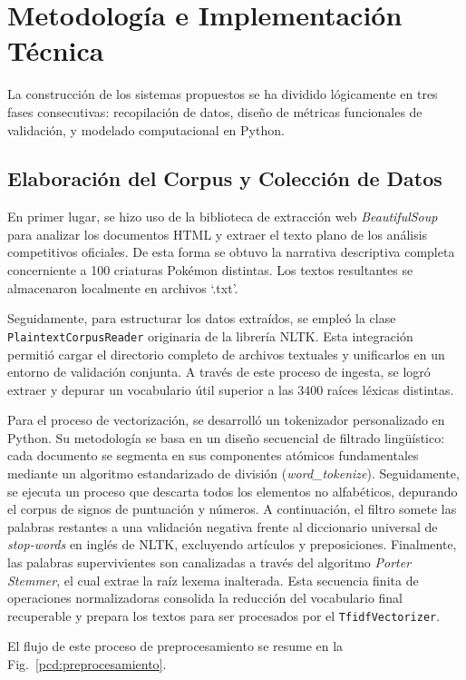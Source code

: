\documentclass[conference,a4paper]{IEEEtran}
\def\figurename{Fig.}
\begin{document}
\section{Metodología e Implementación Técnica}

La construcción de los sistemas propuestos se ha dividido lógicamente en tres fases consecutivas: recopilación de datos, diseño de métricas funcionales de validación, y modelado computacional en Python.

\subsection{Elaboración del Corpus y Colección de Datos}

En primer lugar, se hizo uso de la biblioteca de extracción web \emph{BeautifulSoup} para analizar los documentos HTML y extraer el texto plano de los análisis competitivos oficiales. De esta forma se obtuvo la narrativa descriptiva completa concerniente a 100 criaturas Pokémon distintas. Los textos resultantes se almacenaron localmente en archivos `.txt'. 

Seguidamente, para estructurar los datos extraídos, se empleó la clase \texttt{PlaintextCorpusReader} originaria de la librería NLTK. Esta integración permitió cargar el directorio completo de archivos textuales y unificarlos en un entorno de validación conjunta. A través de este proceso de ingesta, se logró extraer y depurar un vocabulario útil superior a las 3400 raíces léxicas distintas.

Para el proceso de vectorización, se desarrolló un tokenizador personalizado en Python. Su metodología se basa en un diseño secuencial de filtrado lingüístico: cada documento se segmenta en sus componentes atómicos fundamentales mediante un algoritmo estandarizado de división (\emph{word\_tokenize}). Seguidamente, se ejecuta un proceso que descarta todos los elementos no alfabéticos, depurando el corpus de signos de puntuación y números. A continuación, el filtro somete las palabras restantes a una validación negativa frente al diccionario universal de \emph{stop-words} en inglés de NLTK, excluyendo artículos y preposiciones. Finalmente, las palabras supervivientes son canalizadas a través del algoritmo \emph{Porter Stemmer}, el cual extrae la raíz lexema inalterada. Esta secuencia finita de operaciones normalizadoras consolida la reducción del vocabulario final recuperable y prepara los textos para ser procesados por el \texttt{TfidfVectorizer}.

El flujo de este proceso de preprocesamiento se resume en la \figurename~\ref{pcd:preprocesamiento}.
\end{document}
